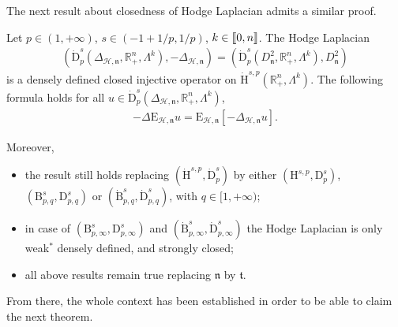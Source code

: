 \documentclass[10pt]{amsart}
\theoremstyle{definition}\newtheorem{defi}[theo]{Definition}\newtheorem{rema}[theo]{Remark}\newtheorem{exam}[theo]{Example}\newtheorem{exem}[theo]{Example}\newtheorem{nota}[theo]{Notation}
\newcommand{\bbR}{\mathbb{R}}
\newcommand{\rmH}{\mathrm{H}}%
\newcommand{\rmB}{\mathrm{B}}
\newcommand{\rmD}{\mathrm{D}}
\newcommand{\rmE}{\mathrm{E}}
\newcommand{\clH}{\mathcal{H}}
\newcommand{\fkn}{\mathfrak{n}}
\newcommand{\fkt}{\mathfrak{t}}
\newcommand{\llbracket}{\mathopen{[\mkern -2.7mu[}}
\newcommand{\rrbracket}{\mathclose{]\mkern -2.7mu]}}
\newcommand{\llb}{\llbracket}
\newcommand{\rrb}{\rrbracket}
\begin{document}
The next result about closedness of Hodge Laplacian admits a similar proof.

\begin{prop}\label{prop:ExtOpHodgeLapRn+}
Let $p\in(1,+\infty)$, $s\in(-1+1/p,1/p)$, $k\in\llb 0,n \rrb$. The Hodge Laplacian
\begin{align*}
\left(\dot{\rmD}^{s}_{p}\left(\Delta_{\clH,\fkn},\bbR^n_+,\Lambda^k\right),-\Delta_{\clH,\fkn}\right)=\left(\dot{\rmD}^{s}_{p}\left(D_\fkn^2,\bbR^n_+,\Lambda^k\right),D_\fkn^2\right)
\end{align*}
is a densely defined closed injective operator on $\dot{\rmH}^{s,p}(\bbR^n_+,\Lambda^k)$. The following formula holds for all $u\in \dot{\rmD}^{s}_{p}(\Delta_{\clH,\fkn},\bbR^n_+,\Lambda^k)$,
\begin{align*}
-\Delta \rmE _{\clH,\fkn} u = \rmE _{\clH,\fkn}\left[-\Delta_{\clH,\fkn} u\right].
\end{align*}

Moreover,
\begin{itemize}
\item the result still holds replacing $(\dot{\rmH}^{s,p},\dot{\rmD}^{s}_{p})$ by either $({\rmH}^{s,p},{\rmD}^{s}_{p})$, $(\rmB^{s}_{p,q},\rmD^{s}_{p,q})$ or $(\dot{\rmB}^{s}_{p,q},\dot{\rmD}^{s}_{p,q})$, with $q\in[1,+\infty)$;

\item in case of $(\rmB^{s}_{p,\infty},\rmD^{s}_{p,\infty})$ and $(\dot{\rmB}^{s}_{p,\infty},\dot{\rmD}^{s}_{p,\infty})$ the Hodge Laplacian is only weak${}^\ast$ densely defined, and strongly closed;

\item all above results remain true replacing $\fkn$ by $\fkt$.
\end{itemize}
\end{prop}


From there, the whole context has been established in order to be able to claim the next theorem.
\end{document}
